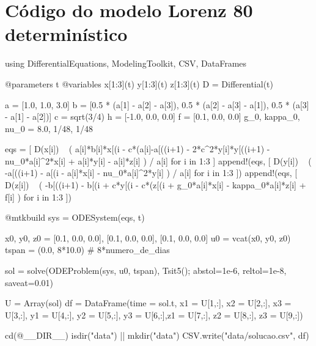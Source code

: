 \section{Código do modelo Lorenz 80 determinístico}
\begin{juliacode}[caption={Simulação do modelo Lorenz 80}]
using DifferentialEquations, ModelingToolkit, CSV, DataFrames

@parameters t
@variables x[1:3](t) y[1:3](t) z[1:3](t)
D = Differential(t)

a = [1.0, 1.0, 3.0]
b = [0.5 * (a[1] - a[2] - a[3]), 0.5 * (a[2] - a[3] - a[1]), 0.5 * (a[3] - a[1] - a[2])]
c = sqrt(3/4)
h = [-1.0, 0.0, 0.0]
f = [0.1, 0.0, 0.0]
g_0, kappa_0, nu_0 = 8.0, 1/48, 1/48

eqs = [
    D(x[i]) ~ (
        a[i]*b[i]*x[(i %
        - c*(a[i]-a[((i+1) %
        - 2*c^2*y[i]*y[((i+1) %
        - nu_0*a[i]^2*x[i]
        + a[i]*y[i] - a[i]*z[i]
    ) / a[i] for i in 1:3
]
append!(eqs, [
    D(y[i]) ~ (
        -a[((i+1) %
        - a[(i %
        - a[i]*x[i] - nu_0*a[i]^2*y[i]
    ) / a[i] for i in 1:3
])
append!(eqs, [
    D(z[i]) ~ (
        -b[((i+1) %
        - b[(i %
        + c*y[(i %
        - c*(z[(i %
        + g_0*a[i]*x[i] - kappa_0*a[i]*z[i] + f[i]
    ) for i in 1:3
])

@mtkbuild sys = ODESystem(eqs, t)

x0, y0, z0 = [0.1, 0.0, 0.0], [0.1, 0.0, 0.0], [0.1, 0.0, 0.0]
u0 = vcat(x0, y0, z0)
tspan = (0.0, 8*10.0) # 8*numero_de_dias

sol = solve(ODEProblem(sys, u0, tspan), Tsit5(); abstol=1e-6, reltol=1e-8, saveat=0.01)

U = Array(sol)
df = DataFrame(time = sol.t, x1 = U[1,:], x2 = U[2,:], x3 = U[3,:], y1 = U[4,:], y2 = U[5,:], y3 = U[6,:],z1 = U[7,:], z2 = U[8,:], z3 = U[9,:])

cd(@__DIR__)  
isdir("data") || mkdir("data")
CSV.write("data/solucao.csv", df)
\end{juliacode}
